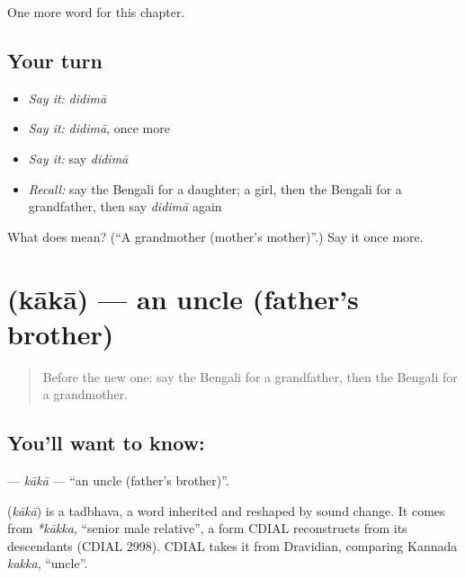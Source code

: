 \begin{grammarlens}[title={What you've built}]
One more word for this chapter.
\end{grammarlens}

\subsection*{Your turn}
\begin{itemize}
\raggedright
  \item \emph{Say it:} \emph{didimā}
  \item \emph{Say it:} \emph{didimā}, once more
  \item \emph{Say it:} say \emph{didimā}
  \item \emph{Recall:} say the Bengali for a daughter; a girl, then the Bengali for a grandfather, then say \emph{didimā} again
\end{itemize}

\begin{tcolorbox}[breakable,colback=teal!4,colframe=teal!35!black,title={Before you move on}]
What does  mean? (\textquotedblleft{}A grandmother (mother's mother)\textquotedblright{}.) Say it once more.
\end{tcolorbox}
\section[\texorpdfstring{\bn{কাকা} (kākā)}{কাকা (kākā)}]{ (kākā) — an uncle (father's brother)}

\label{lesson:BN-C46-kaka}



\begin{quote}
Before the new one: say the Bengali for a grandfather, then the Bengali for a grandmother.
\end{quote}

\subsection*{You'll want to know: }
\textbf{} — \emph{kākā} — \textquotedblleft{}an uncle (father's brother)\textquotedblright{}.

\begin{cousinweb}
\textbf{} (\emph{kākā}) is a tadbhava, a word inherited and reshaped by sound change. It comes from \emph{*kākka}, \textquotedblleft{}senior male relative\textquotedblright{}, a form CDIAL reconstructs from its descendants (CDIAL 2998). CDIAL takes it from Dravidian, comparing Kannada \emph{kakka}, \textquotedblleft{}uncle\textquotedblright{}.
\end{cousinweb}

